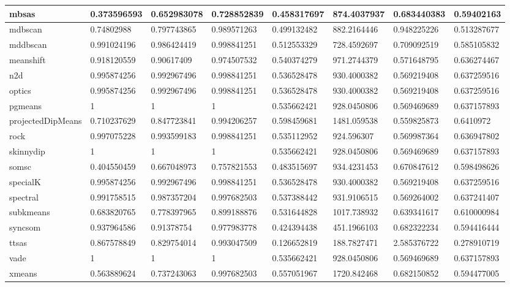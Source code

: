 \begin{table}[H]
\begin{tabular}{|l|l|l|l|l|l|l|l|}
\hline
mbsas & 0.373596593 & 0.652983078 & 0.728852839 & 0.458317697 & 874.4037937 & 0.683440383 & 0.59402163 \\
\hline
mdbscan & 0.74802988 & 0.797743865 & 0.989571263 & 0.499132482 & 882.2164446 & 0.948225226 & 0.513287677 \\
\hline
mddbscan & 0.991024196 & 0.986424419 & 0.998841251 & 0.512553329 & 728.4592697 & 0.709092519 & 0.585105832 \\
\hline
meanshift & 0.918120559 & 0.90617409 & 0.974507532 & 0.540374279 & 971.2744379 & 0.571648795 & 0.636274467 \\
\hline
n2d & 0.995874256 & 0.992967496 & 0.998841251 & 0.536528478 & 930.4000382 & 0.569219408 & 0.637259516 \\
\hline
optics & 0.995874256 & 0.992967496 & 0.998841251 & 0.536528478 & 930.4000382 & 0.569219408 & 0.637259516 \\
\hline
pgmeans & 1 & 1 & 1 & 0.535662421 & 928.0450806 & 0.569469689 & 0.637157893 \\
\hline
projectedDipMeans & 0.710237629 & 0.847723841 & 0.994206257 & 0.598459681 & 1481.059538 & 0.559825873 & 0.6410972 \\
\hline
rock & 0.997075228 & 0.993599183 & 0.998841251 & 0.535112952 & 924.596307 & 0.569987364 & 0.636947802 \\
\hline
skinnydip & 1 & 1 & 1 & 0.535662421 & 928.0450806 & 0.569469689 & 0.637157893 \\
\hline
somsc & 0.404550459 & 0.667048973 & 0.757821553 & 0.483515697 & 934.4231453 & 0.670847612 & 0.598498626 \\
\hline
specialK & 0.995874256 & 0.992967496 & 0.998841251 & 0.536528478 & 930.4000382 & 0.569219408 & 0.637259516 \\
\hline
spectral & 0.991758515 & 0.987357204 & 0.997682503 & 0.537388442 & 931.9106515 & 0.569264002 & 0.637241407 \\
\hline
subkmeans & 0.683820765 & 0.778397965 & 0.899188876 & 0.531644828 & 1017.738932 & 0.639341617 & 0.610000984 \\
\hline
syncsom & 0.937964586 & 0.91378754 & 0.977983778 & 0.424394438 & 451.1966103 & 0.682322234 & 0.594416444 \\
\hline
ttsas & 0.867578849 & 0.829754014 & 0.993047509 & 0.126652819 & 188.7827471 & 2.585376722 & 0.278910719 \\
\hline
vade & 1 & 1 & 1 & 0.535662421 & 928.0450806 & 0.569469689 & 0.637157893 \\
\hline
xmeans & 0.563889624 & 0.737243063 & 0.997682503 & 0.557051967 & 1720.842468 & 0.682150852 & 0.594477005 \\
\hline
\end{tabular}
\end{table}


